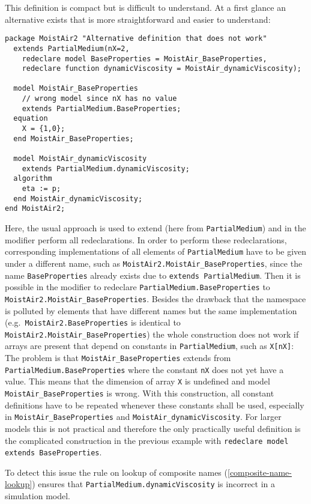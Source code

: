 \begin{nonnormative}
This definition is compact but is difficult to understand. At a
first glance an alternative exists that is more straightforward and
easier to understand:
\begin{lstlisting}[language=modelica]
package MoistAir2 "Alternative definition that does not work"
  extends PartialMedium(nX=2,
    redeclare model BaseProperties = MoistAir_BaseProperties,
    redeclare function dynamicViscosity = MoistAir_dynamicViscosity);

  model MoistAir_BaseProperties
    // wrong model since nX has no value
    extends PartialMedium.BaseProperties;
  equation
    X = {1,0};
  end MoistAir_BaseProperties;

  model MoistAir_dynamicViscosity
    extends PartialMedium.dynamicViscosity;
  algorithm
    eta := p;
  end MoistAir_dynamicViscosity;
end MoistAir2;
\end{lstlisting}

Here, the usual approach is used to extend (here from \lstinline!PartialMedium!) and in the modifier perform all redeclarations.  In order to perform these redeclarations, corresponding implementations of all elements of \lstinline!PartialMedium! have to be given under a different name, such as \lstinline!MoistAir2.MoistAir_BaseProperties!, since the name \lstinline!BaseProperties! already exists due to \lstinline!extends PartialMedium!.  Then it is possible in the modifier to redeclare \lstinline!PartialMedium.BaseProperties! to \lstinline!MoistAir2.MoistAir_BaseProperties!. Besides the drawback that the namespace is polluted by elements that have different names but the same implementation (e.g.\ \lstinline!MoistAir2.BaseProperties! is identical to \lstinline!MoistAir2.MoistAir_BaseProperties!) the whole construction does not work if arrays are present that depend on constants in \lstinline!PartialMedium!, such as \lstinline!X[nX]!: The problem is that \lstinline!MoistAir_BaseProperties! extends from \lstinline!PartialMedium.BaseProperties! where the constant \lstinline!nX! does not yet have a value.  This means that the dimension of array \lstinline!X! is undefined and model \lstinline!MoistAir_BaseProperties! is wrong.  With this construction, all constant definitions have to be repeated whenever these constants shall be used, especially in \lstinline!MoistAir_BaseProperties! and \lstinline!MoistAir_dynamicViscosity!.  For larger models this is not practical and therefore the only practically useful definition is the complicated construction in the previous example with \lstinline!redeclare model extends BaseProperties!.

To detect this issue the rule on lookup of composite names (\cref{composite-name-lookup}) ensures that \lstinline!PartialMedium.dynamicViscosity! is incorrect in a simulation model.
\end{nonnormative}

